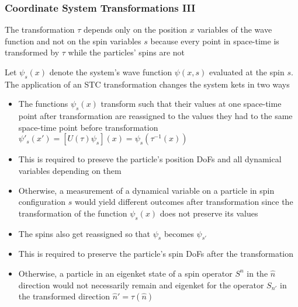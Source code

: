 \documentclass[8pt,t,mathserif,aspectratio=169]{beamer}
\begin{document}
\begin{frame}
  \frametitle{Coordinate System Transformations III}
  \vspace{1mm}
  The transformation $\tau$ depends only on the position $x$ variables of the wave function and not on the spin variables $s$ because every point in space-time is transformed by $\tau$ while the particles' spins are not

  Let $\psi_s(x)$ denote the system's wave function $\psi(x,s)$ evaluated at the spin $s$. The application of an STC transformation changes the system kets in two ways
  \begin{itemize}
    \item The functions $\psi_s(x)$ transform such that their values at one space-time point after transformation are reassigned to the values they had to the same space-time point before transformation $\psi'_s(x') = [U(\tau) \psi_s](x) = \psi_s(\tau^{-1}(x))$
    \item This is required to preseve the particle's position DoFs and all dynamical variables depending on them
    \item Otherwise, a measurement of a dynamical variable on a particle in spin configuration $s$ would yield different outcomes after transformation since the transformation of the function $\psi_s(x)$ does not preserve its values
    \item The spins also get reassigned so that $\psi_s$ becomes $\psi_{s'}$
    \item This is required to preserve the particle's spin DoFs after the transformation 
    \item Otherwise, a particle in an eigenket state of a spin operator $S^n$ in the $\hat{n}$ direction would not necessarily remain and eigenket for the operator $S_{n'}$ in the transformed direction $\hat{n}' = \tau(\hat{n})$
  \end{itemize}
\end{frame}
\end{document}
